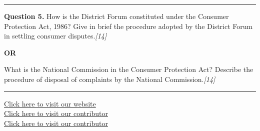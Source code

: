 \documentclass[11pt,a4paper]{article}
\newcommand{\pts}[1]{\hfill   \textit{[#1]}}
\begin{document}
\medskip\rule{\linewidth}{0.2pt}




\noindent   \textbf{Question 5.}
How is the District Forum constituted under the Consumer Protection Act, 1986? Give in brief the procedure adopted by the District Forum in settling consumer disputes.\pts{14}

\centerline{   \textbf{OR}}

What is the National Commission in the Consumer Protection Act? Describe the procedure of disposal of complaints by the National Commission.\pts{14}

\vfill
\rule{\linewidth}{0.4pt}

\begin{center}\small
\href{https://bhu-exam.vercel.app/}{Click here to visit our website}\\[4pt]
\href{https://me-aryan.vercel.app/}{Click here to visit our contributor}\\[4pt]
\href{https://quashan-me.vercel.app/}{Click here to visit our contributor}
\end{center}
\end{document}
